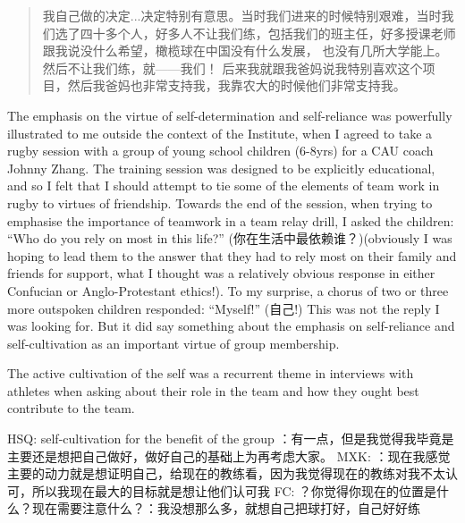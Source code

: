 \begin{CJK}{UTF8}{gbsn}
    \begin{quotation}
      我自己做的决定...决定特别有意思。当时我们进来的时候特别艰难，当时我们选了四十多个人，好多人不让我们练，包括我们的班主任，好多授课老师跟我说没什么希望，橄榄球在中国没有什么发展， 也没有几所大学能上。然后不让我们练，就——我们！ 后来我就跟我爸妈说我特别喜欢这个项目，然后我爸妈也非常支持我，我靠农大的时候他们非常支持我。
    \end{quotation}


  The emphasis on the virtue of self-determination and self-reliance was powerfully illustrated to me outside the context of the Institute, when I agreed to take a rugby session with a group of young school children (6-8yrs) for a CAU coach Johnny Zhang.  The training session was designed to be explicitly educational, and so I felt that I should attempt to tie some of the elements of team work in rugby to virtues of friendship.  Towards the end of the session, when trying to emphasise the importance of teamwork in a team relay drill, I asked the children: ``Who do you rely on most in this life?'' (你在生活中最依赖谁？)(obviously I was hoping to lead them to the answer that they had to rely most on their family and friends for support, what I thought was a relatively obvious response in either Confucian or Anglo-Protestant ethics!).  To my surprise, a chorus of two or three more outspoken children responded: ``Myself!'' (自己!) This was not the reply I was looking for. But it did say something about the emphasis on self-reliance and self-cultivation as an important virtue of group membership.



  The active cultivation of the self was a recurrent theme in interviews with athletes when asking about their role in the team and how they ought best contribute to the team.

  HSQ: self-cultivation for the benefit of the group
  ：有一点，但是我觉得我毕竟是主要还是想把自己做好，做好自己的基础上为再考虑大家。
  MXK:
  ：现在我感觉主要的动力就是想证明自己，给现在的教练看，因为我觉得现在的教练对我不太认可，所以我现在最大的目标就是想让他们认可我
  FC:
  ？你觉得你现在的位置是什么？现在需要注意什么？：我没想那么多，就想自己把球打好，自己好好练



\end{CJK}
